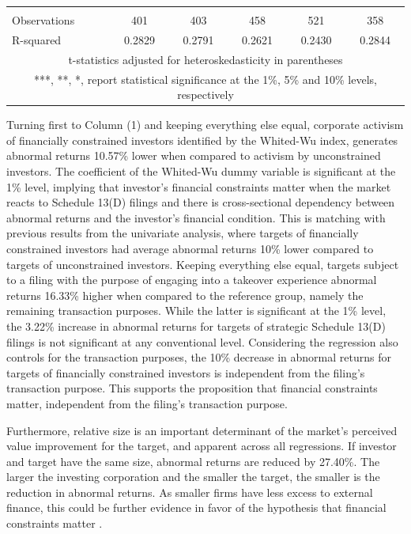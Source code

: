 \documentclass[12pt]{article}
\begin{document}
\begin{table}[!htbp]
\begin{adjustbox}{max width=\textwidth}
\begin{tabular}{lccccc}
			 &  &  &  &  &  \\
			Observations & 401 & 403 & 458 & 521 & 358 \\
			 R-squared & 0.2829 & 0.2791 & 0.2621 & 0.2430 & 0.2844 \\ \hline
			\multicolumn{6}{c}{ t-statistics adjusted for heteroskedasticity in parentheses} \\
			\multicolumn{6}{c}{ ***, **, *, report statistical significance at the 1\%, 5\% and 10\% levels, respectively}\\
			\end{tabular}			
	\end{adjustbox}
\end{table}
Turning first to Column (1) and keeping everything else equal, corporate activism of financially constrained investors identified by the Whited-Wu index, generates abnormal returns 10.57\% lower when compared to activism by unconstrained investors. The coefficient of the Whited-Wu dummy variable is significant at the 1\% level, implying that investor's financial constraints matter when the market reacts to Schedule 13(D) filings and there is cross-sectional dependency between abnormal returns and the investor's financial condition. This is matching with previous results from the univariate analysis, where targets of financially constrained investors had average abnormal returns 10\% lower compared to targets of unconstrained investors. Keeping everything else equal, targets subject to a filing with the purpose of engaging into a takeover experience abnormal returns 16.33\% higher when compared to the reference group, namely the remaining transaction purposes. While the latter is significant at the 1\% level, the 3.22\% increase in abnormal returns for targets of strategic Schedule 13(D) filings is not significant at any conventional level. Considering the regression also controls for the transaction purposes, the 10\% decrease in abnormal returns for targets of financially constrained investors is independent from the filing's transaction purpose. This supports the proposition that financial constraints matter, independent from the filing's transaction purpose.\par
Furthermore, relative size is an important determinant of the market's perceived value improvement for the target, and apparent across all regressions. If investor and target have the same size, abnormal returns are reduced by 27.40\%. The larger the investing corporation and the smaller the target, the smaller is the reduction in abnormal returns. As smaller firms have less excess to external finance, this could be further evidence in favor of the hypothesis that financial constraints matter \citep[p.15]{heller2015}.\par
\end{document}
